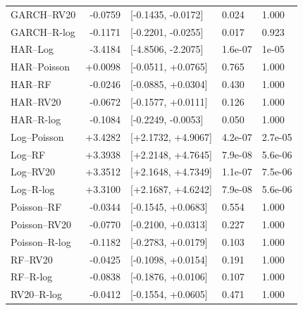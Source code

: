 \begin{longtable}{@{}lrlll@{}}
GARCH--RV20 & -0.0759 & [-0.1435, -0.0172] & 0.024 & 1.000 \\
GARCH--R-log & -0.1171 & [-0.2201, -0.0255] & 0.017 & 0.923 \\
HAR--Log & -3.4184 & [-4.8506, -2.2075] & 1.6e-07 & 1e-05 \\
HAR--Poisson & +0.0098 & [-0.0511, +0.0765] & 0.765 & 1.000 \\
HAR--RF & -0.0246 & [-0.0885, +0.0304] & 0.430 & 1.000 \\
HAR--RV20 & -0.0672 & [-0.1577, +0.0111] & 0.126 & 1.000 \\
HAR--R-log & -0.1084 & [-0.2249, -0.0053] & 0.050 & 1.000 \\
Log--Poisson & +3.4282 & [+2.1732, +4.9067] & 4.2e-07 & 2.7e-05 \\
Log--RF & +3.3938 & [+2.2148, +4.7645] & 7.9e-08 & 5.6e-06 \\
Log--RV20 & +3.3512 & [+2.1648, +4.7349] & 1.1e-07 & 7.5e-06 \\
Log--R-log & +3.3100 & [+2.1687, +4.6242] & 7.9e-08 & 5.6e-06 \\
Poisson--RF & -0.0344 & [-0.1545, +0.0683] & 0.554 & 1.000 \\
Poisson--RV20 & -0.0770 & [-0.2100, +0.0313] & 0.227 & 1.000 \\
Poisson--R-log & -0.1182 & [-0.2783, +0.0179] & 0.103 & 1.000 \\
RF--RV20 & -0.0425 & [-0.1098, +0.0154] & 0.191 & 1.000 \\
RF--R-log & -0.0838 & [-0.1876, +0.0106] & 0.107 & 1.000 \\
RV20--R-log & -0.0412 & [-0.1554, +0.0605] & 0.471 & 1.000 \\
\bottomrule\end{longtable}\endgroup
\clearpage\begingroup\small\setlength{\tabcolsep}{4.2pt}\renewcommand{\arraystretch}{1.09}
